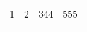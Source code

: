 \begin{myenv}
	\begin{tabular}{@{}*{2}{c}@{}}
		1 & 2 & 344 & 555 \\
		  &   &     &
	\end{tabular}
\end{myenv}
